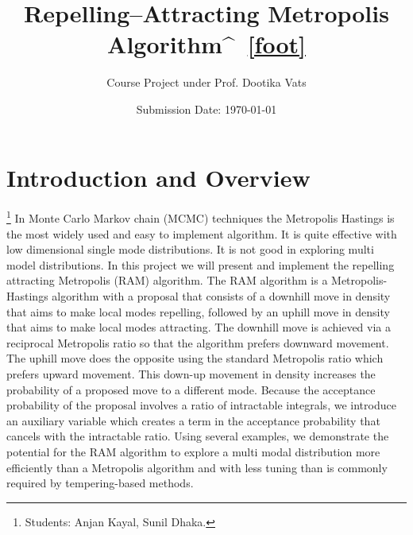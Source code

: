 \documentclass{article}
\title{Repelling–Attracting Metropolis Algorithm^{~\ref{foot}}}
\author{Course Project under Prof. Dootika Vats}
\date{Submission Date: \today}
\begin{document}
\tableofcontents
\newpage
\maketitle

\section{Introduction and Overview}\footnote{\label{foot}Students: Anjan Kayal, Sunil Dhaka.}%
In Monte Carlo Markov chain (MCMC) techniques the Metropolis Hastings is the most widely used and easy to implement algorithm. It is quite effective with low dimensional single mode distributions. It is not good in exploring multi model distributions. In this project we will present and implement the repelling attracting Metropolis (RAM) algorithm.
The RAM
algorithm is a Metropolis-Hastings algorithm with a proposal that consists of a downhill move in density that
aims to make local modes repelling, followed by an uphill move in density that aims to make local modes
attracting. The downhill move is achieved via a reciprocal Metropolis ratio so that the algorithm prefers
downward movement. The uphill move does the opposite using the standard Metropolis ratio which prefers
upward movement. This down-up movement in density increases the probability of a proposed move to a
different mode. Because the acceptance probability of the proposal involves a ratio of intractable integrals,
we introduce an auxiliary variable which creates a term in the acceptance probability that cancels with the
intractable ratio. Using several examples, we demonstrate the potential for the RAM algorithm to explore a
multi modal distribution more efficiently than a Metropolis algorithm and with less tuning than is commonly
required by tempering-based methods.
\end{document}

